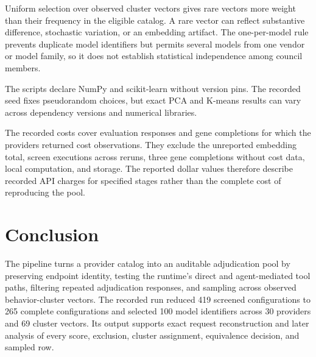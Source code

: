 \documentclass[11pt]{article}
\begin{document}
Uniform selection over observed cluster vectors gives rare vectors more weight than their frequency in the eligible catalog.  A rare vector can reflect substantive difference, stochastic variation, or an embedding artifact.  The one-per-model rule prevents duplicate model identifiers but permits several models from one vendor or model family, so it does not establish statistical independence among council members.

The scripts declare NumPy and scikit-learn without version pins.  The recorded seed fixes pseudorandom choices, but exact PCA and K-means results can vary across dependency versions and numerical libraries.

The recorded costs cover evaluation responses and gene completions for which the providers returned cost observations.  They exclude the unreported embedding total, screen executions across reruns, three gene completions without cost data, local computation, and storage.  The reported dollar values therefore describe recorded API charges for specified stages rather than the complete cost of reproducing the pool.

\section{Conclusion}

The pipeline turns a provider catalog into an auditable adjudication pool by preserving endpoint identity, testing the runtime's direct and agent-mediated tool paths, filtering repeated adjudication responses, and sampling across observed behavior-cluster vectors.  The recorded run reduced 419 screened configurations to 265 complete configurations and selected 100 model identifiers across 30 providers and 69 cluster vectors.  Its output supports exact request reconstruction and later analysis of every score, exclusion, cluster assignment, equivalence decision, and sampled row.
\end{document}
